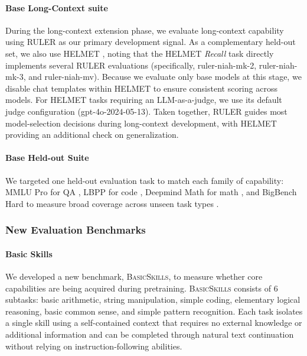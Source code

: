 \documentclass[table]{ai2style/ai2}
\begin{document}
{{\paragraph{Base Long-Context suite} During the long-context extension phase, we evaluate long-context capability using RULER \citep{hsieh2024rulerwhatsrealcontext} as our primary development signal. As a complementary held-out set, we also use HELMET \citep{yen2025helmet}, noting that the HELMET \emph{Recall} task directly implements several RULER evaluations (specifically, ruler-niah-mk-2, ruler-niah-mk-3, and ruler-niah-mv). Because we evaluate only base models at this stage, we disable chat templates within HELMET to ensure consistent scoring across models. For HELMET tasks requiring an LLM-as-a-judge, we use its default judge configuration (gpt-4o-2024-05-13). Taken together, RULER guides most model-selection decisions during long-context development, with HELMET providing an additional check on generalization.

\paragraph{Base Held-out Suite} We targeted one held-out evaluation task to match each family of capability: MMLU Pro for QA \citep{wang2024mmlu}, LBPP for code \citep{matton-etal-2024-leakage}, Deepmind Math for math \citep{saxton2019analysing}, and BigBench Hard to measure broad coverage across unseen task types \citep{suzgun2022challenging}.

\subsubsection{New Evaluation Benchmarks}
\label{sec:new-evaluation-benchmarks}

\paragraph{Basic Skills} We developed a new benchmark, \textsc{BasicSkills}, to measure whether core capabilities are being acquired during pretraining. \textsc{BasicSkills} consists of 6 subtasks: basic arithmetic, string manipulation, simple coding, elementary logical reasoning, basic common sense, and simple pattern recognition. Each task isolates a single skill using a self-contained context that requires no external knowledge or additional information and can be completed through natural text continuation without relying on instruction-following abilities.

}}
\end{document}
